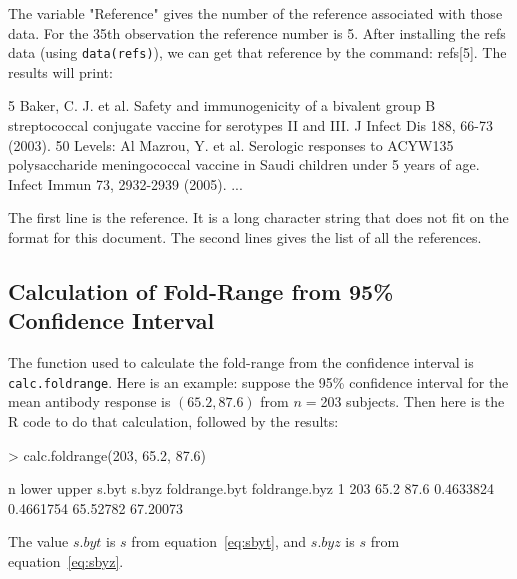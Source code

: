 \documentclass{article}[12pt]
\begin{document}
The variable "Reference" gives the number of the reference associated with those data. 
For the 35th observation the reference number is 5.
After installing the refs data (using \texttt{data(refs)}), we can get that reference by the command: 
refs[5]. The results will print:
\begin{Schunk}
\begin{Soutput}
                                                                                                                                                            5 
Baker, C. J. et al. Safety and immunogenicity of a bivalent group B streptococcal conjugate vaccine for serotypes II and III. J Infect Dis 188, 66-73 (2003). 
50 Levels: Al Mazrou, Y. et al. Serologic responses to ACYW135 polysaccharide meningococcal vaccine in Saudi children under 5 years of age. Infect Immun 73, 2932-2939 (2005). ...
\end{Soutput}
\end{Schunk}
The first line is the reference. It is a long character string that does not fit on the format for this document. 
The second lines gives the list of all the references.

\subsection{Calculation of Fold-Range from 95\% Confidence 
Interval}
\label{app:estsd}

The function used to calculate the fold-range from the confidence 
interval is \texttt{calc.foldrange}. Here is an  example: suppose 
the 95\% confidence interval for the mean antibody response is 
$(65.2, 87.6)$ from $n=$203 subjects. Then here is the R code to do that calculation, followed by the results:

\begin{Schunk}
\begin{Sinput}
> calc.foldrange(203, 65.2, 87.6)
\end{Sinput}
\begin{Soutput}
    n lower upper     s.byt     s.byz foldrange.byt foldrange.byz
1 203  65.2  87.6 0.4633824 0.4661754      65.52782      67.20073
\end{Soutput}
\end{Schunk}
The value $s.byt$ is $s$ from equation~\ref{eq:sbyt}, and  $s.byz$ is $s$ from equation~\ref{eq:sbyz}.
\end{document}
